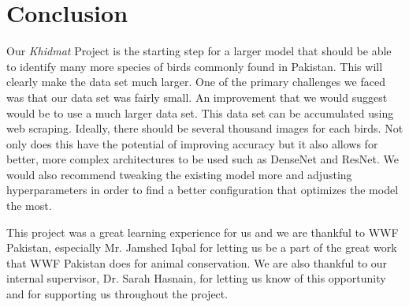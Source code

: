 \documentclass[11pt]{article}
\begin{document}
\section{Conclusion}%
\label{sec:conclusion}
Our \textit{Khidmat} Project is the starting step for a larger model that should be able 
to identify many more species of birds commonly found in Pakistan. This will clearly make
the data set much larger. One of the primary challenges we faced was that our data set was fairly
small. An improvement that we would suggest would be to use a much larger data set. This data 
set can be accumulated using web scraping. Ideally, there should be several thousand 
images for each birds. Not only does this have the potential of improving accuracy but it also 
allows for better, more complex architectures to be used such as DenseNet and ResNet.
We would also recommend tweaking the existing model more and adjusting hyperparameters in 
order to find a better configuration that optimizes the model the most.

This project was a great learning experience for us and we are thankful to WWF Pakistan, 
especially Mr. Jamshed Iqbal for letting us be a part of the great work that WWF Pakistan does 
for animal conservation. We are also thankful to our internal supervisor, Dr. Sarah Hasnain, 
for letting us know of this opportunity and for supporting us throughout the project.
\end{document}

